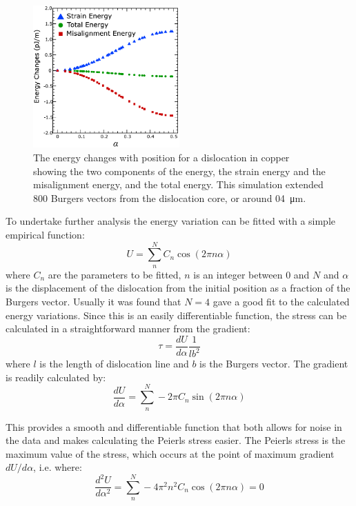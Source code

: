 \begin{figure}
\centering
\includegraphics[width=0.5\textwidth]{Copper_800_rel_energies}
\caption[The energy changes with dislocation position for  copper.]{The energy changes with position for a dislocation in copper showing the two components of the energy, the strain energy and the misalignment energy, and the total energy. This simulation extended \num{800} Burgers vectors from the dislocation core, or around \SI{04}{\micro\meter}.\label{fig:copper_800_rel_energies}}
\end{figure}




To undertake further analysis the energy variation can be fitted with a simple empirical function:
\begin{equation}
U = \sum^N_n C_n \cos (2 \pi n \alpha) \label{eqn:empirical_function}
\end{equation}
where $C_n$ are the parameters to be fitted, $n$ is an integer between $0$ and $N$ and $\alpha$ is the displacement of the dislocation from the initial position as a fraction of the Burgers vector. Usually it was found that $N=4$ gave a good fit to the calculated energy variations. Since this is an easily differentiable function, the stress can be calculated in a straightforward manner from the gradient:
\begin{equation}
\tau = \frac{dU}{d\alpha} \frac{1}{lb^2}
\end{equation}
where $l$ is the length of dislocation line and $b$ is the Burgers vector. The gradient is readily calculated by:
\begin{equation}
\frac{dU}{d\alpha} = \sum_n^N - 2 \pi C_n \sin ( 2 \pi n \alpha )
\end{equation}

This provides a smooth and differentiable function that both allows for noise in the data and makes calculating the Peierls stress easier. The Peierls stress is the maximum value of the stress, which occurs at the point of maximum gradient $dU/d\alpha$, i.e. where:
\begin{equation}
\frac{d^2U}{d\alpha^2} = \sum_n^N -4 \pi^2 n^2 C_n \cos ( 2 \pi n \alpha ) = 0
\end{equation}

